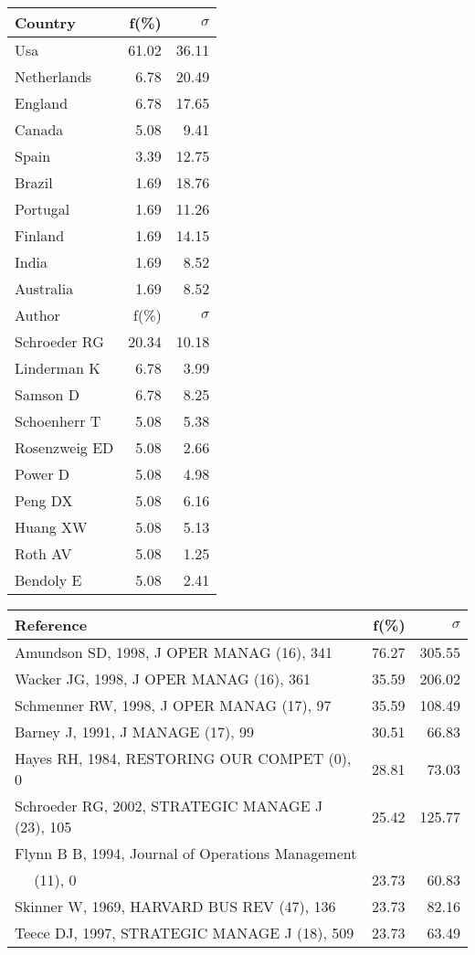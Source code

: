 \documentclass[a4paper,11pt]{report}
\begin{document}
\begin{landscape}
\begin{table}[!ht]
{\begin{tabular}{|l r r|}
\hline
\hline
Country & f(\%) & $\sigma$\\
\hline
Usa & 61.02 & 36.11\\
Netherlands & 6.78 & 20.49\\
England & 6.78 & 17.65\\
Canada & 5.08 & 9.41\\
Spain & 3.39 & 12.75\\
Brazil & 1.69 & 18.76\\
Portugal & 1.69 & 11.26\\
Finland & 1.69 & 14.15\\
India & 1.69 & 8.52\\
Australia & 1.69 & 8.52\\
\hline
\hline
Author & f(\%) & $\sigma$\\
\hline
Schroeder RG & 20.34 & 10.18\\
Linderman K & 6.78 & 3.99\\
Samson D & 6.78 & 8.25\\
Schoenherr T & 5.08 & 5.38\\
Rosenzweig ED & 5.08 & 2.66\\
Power D & 5.08 & 4.98\\
Peng DX & 5.08 & 6.16\\
Huang XW & 5.08 & 5.13\\
Roth AV & 5.08 & 1.25\\
Bendoly E & 5.08 & 2.41\\
\hline
\end{tabular}
}
{\scriptsize\begin{tabular}{|l r r|}
\hline
Reference & f(\%) & $\sigma$\\
\hline
Amundson SD, 1998, J OPER MANAG (16), 341 & 76.27 & 305.55\\
Wacker JG, 1998, J OPER MANAG (16), 361 & 35.59 & 206.02\\
Schmenner RW, 1998, J OPER MANAG (17), 97 & 35.59 & 108.49\\
Barney J, 1991, J MANAGE (17), 99 & 30.51 & 66.83\\
Hayes RH, 1984, RESTORING OUR COMPET (0), 0 & 28.81 & 73.03\\
Schroeder RG, 2002, STRATEGIC MANAGE J (23), 105 & 25.42 & 125.77\\
Flynn B B, 1994, Journal of Operations Management &  & \\
$\quad$ (11), 0 & 23.73 & 60.83\\
Skinner W, 1969, HARVARD BUS REV (47), 136 & 23.73 & 82.16\\
Teece DJ, 1997, STRATEGIC MANAGE J (18), 509 & 23.73 & 63.49\\

\end{tabular}}
\end{table}
\end{landscape}
\end{document}
